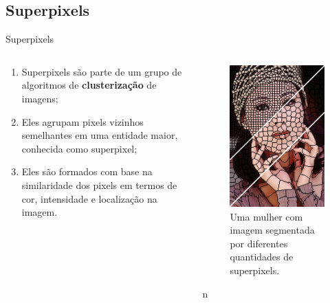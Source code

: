 \documentclass{templatebeamerufc/libs/ufc_format}
\begin{document}
\subsection{Superpixels}
\begin{frame}{Superpixels}
  \begin{columns}{}
    \begin{column}{0.5\textwidth}
      \begin{enumerate}
      \item Superpixels são parte de um grupo de algoritmos de
        \textbf{clusterização} de imagens;
      \item Eles agrupam pixels vizinhos semelhantes em uma entidade
        maior, conhecida como superpixel;
      \item Eles são formados com base na similaridade dos pixels em
        termos de cor, intensidade e localização na imagem.
      \end{enumerate}
    \end{column}
    \begin{column}{0.5\textwidth}
      \begin{figure}\label{fig:superpixel-variation}
        \centering
        \caption{Uma mulher com imagem segmentada por diferentes
          quantidades de superpixels.}
        \includegraphics[scale=0.32]{figuras/superpixel-variation}
      \end{figure}n
    \end{column}
  \end{columns}
\end{frame}
\end{document}
